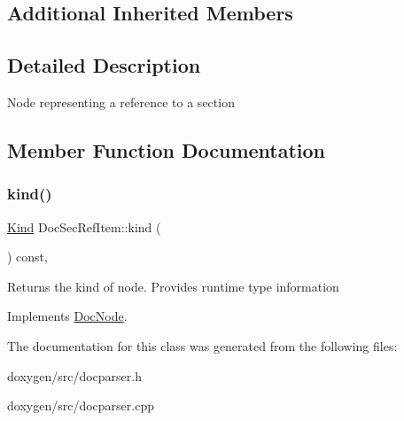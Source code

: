 \subsection*{Additional Inherited Members}


\subsection{Detailed Description}
Node representing a reference to a section 

\subsection{Member Function Documentation}
\mbox{\label{class_doc_sec_ref_item_af0f20ee986f4b4bb4a126b8bb55e16b4}} 
\subsubsection{\texorpdfstring{kind()}{kind()}}
{\footnotesize\ttfamily \mbox{\hyperlink{class_doc_node_aebd16e89ca590d84cbd40543ea5faadb}{Kind}} Doc\+Sec\+Ref\+Item\+::kind (\begin{DoxyParamCaption}{ }\end{DoxyParamCaption}) const\hspace{0.3cm}{\ttfamily [inline]}, {\ttfamily [virtual]}}

Returns the kind of node. Provides runtime type information 

Implements \mbox{\hyperlink{class_doc_node_a108ffd214a72ba6e93dac084a8f58049}{Doc\+Node}}.



The documentation for this class was generated from the following files\+:\begin{DoxyCompactItemize}
\item 
doxygen/src/docparser.\+h\item 
doxygen/src/docparser.\+cpp\end{DoxyCompactItemize}
